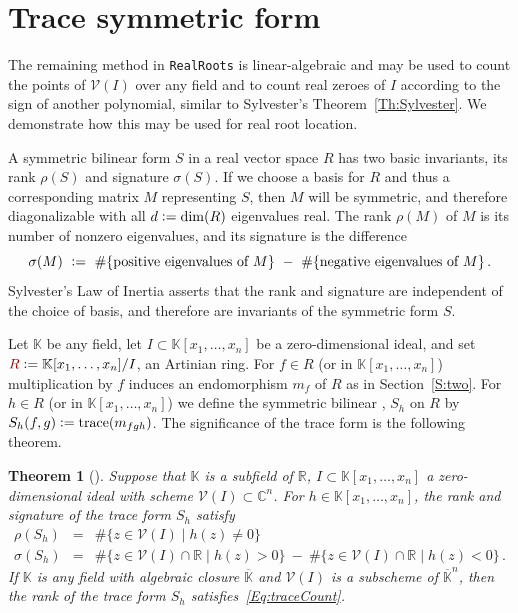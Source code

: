\documentclass[12pt]{amsart}
\newtheorem{theorem}{Theorem}
\theoremstyle{definition}
\newcommand{\CC}{\mathbb{C}}
\newcommand{\RR}{\mathbb{R}}
\newcommand{\KK}{\mathbb{K}}
\newcommand{\calV}{\mathcal{V}}
\newcommand{\defcolor}[1]{{\color{TAMU}#1}}
\newcommand{\demph}[1]{\defcolor{{\sl #1}}}
\begin{document}
\section{Trace symmetric form}\label{S:three}
%
%
The remaining method in \texttt{RealRoots} is linear-algebraic and may be used to count the points of $\calV(I)$ over any
field and to count real zeroes of $I$ according to 
the sign of another polynomial, similar to Sylvester's Theorem~\ref{Th:Sylvester}.
We demonstrate how this may be used for real root location.

A symmetric bilinear form \defcolor{$S$} in a real vector space $R$ has two basic invariants, its rank \defcolor{$\rho(S)$} and signature
\defcolor{$\sigma(S)$}.
If we choose a basis for $R$ and thus a corresponding matrix $M$ representing $S$, then $M$ will be symmetric, and therefore 
diagonalizable with all $d\vcentcolon = \dim(R)$ eigenvalues real.
The rank $\rho(M)$ of $M$ is its number of nonzero eigenvalues, and its signature  is the difference
\[
\sigma(M)\ \vcentcolon =\ \#\{\mbox{positive eigenvalues of $M$}\}
\ -\ \#\{\mbox{negative eigenvalues of $M$}\}\,.
\]
Sylvester's Law of Inertia asserts that the rank and signature are independent of the choice of basis, and therefore are invariants of the
symmetric form $S$.

Let $\KK$ be any field, let $I\subset\KK[x_1,\dotsc,x_n]$ be a zero-dimensional ideal, and set
$\defcolor{R}\vcentcolon=\KK[x_1,\dotsc,x_n]/I$, an  Artinian ring.    
For $f\in R$ (or in $\KK[x_1,\dotsc,x_n]$) multiplication by $f$ induces an endomorphism $m_f$ of $R$ as in Section~\ref{S:two}.
For $h\in R$ (or in $\KK[x_1,\dotsc,x_n]$) we define the symmetric bilinear \demph{trace form}, \defcolor{$S_h$} on $R$ by
$S_h(f,g)\vcentcolon= \mbox{trace}(m_{fgh})$.
The significance of the trace form is the following theorem.

\begin{theorem}[]
  Suppose that $\KK$ is a subfield of $\RR$,  $I\subset\KK[x_1,\dotsc,x_n]$ a zero-dimensional ideal with scheme
  $\calV(I)\subset\CC^n$.
  For $h\in\KK[x_1,\dotsc,x_n]$, the rank and signature of the trace form $S_h$ satisfy
  \begin{eqnarray}
    \rho(S_h)&=&    \label{Eq:traceCount}
      \#\{ z \in \calV(I) \mid h(z)\neq 0\}   \\
    \sigma(S_h)&=&
        \#\{ z \in \calV(I)\cap\RR \mid h(z)> 0\} \ -\  \nonumber
        \#\{ z \in \calV(I)\cap\RR \mid h(z)< 0\} \,.
  \end{eqnarray}
  If $\KK$ is any field with algebraic closure $\overline{\KK}$ and $\calV(I)$ is a subscheme of $\overline{\KK}^n$, then 
  the rank of the trace form $S_h$ satisfies~\eqref{Eq:traceCount}.
\end{theorem}
\end{document}
